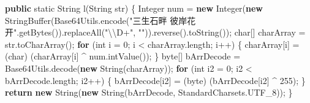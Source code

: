 \documentclass[
]{article}
\newenvironment{Shaded}{}{}
\newcommand{\BuiltInTok}[1]{\textcolor[rgb]{0.00,0.50,0.00}{#1}}
\newcommand{\ControlFlowTok}[1]{\textcolor[rgb]{0.00,0.44,0.13}{\textbf{#1}}}
\newcommand{\DataTypeTok}[1]{\textcolor[rgb]{0.56,0.13,0.00}{#1}}
\newcommand{\DecValTok}[1]{\textcolor[rgb]{0.25,0.63,0.44}{#1}}
\newcommand{\FunctionTok}[1]{\textcolor[rgb]{0.02,0.16,0.49}{#1}}
\newcommand{\KeywordTok}[1]{\textcolor[rgb]{0.00,0.44,0.13}{\textbf{#1}}}
\newcommand{\NormalTok}[1]{#1}
\newcommand{\OperatorTok}[1]{\textcolor[rgb]{0.40,0.40,0.40}{#1}}
\newcommand{\SpecialCharTok}[1]{\textcolor[rgb]{0.25,0.44,0.63}{#1}}
\newcommand{\StringTok}[1]{\textcolor[rgb]{0.25,0.44,0.63}{#1}}
\begin{document}
\begin{Shaded}
\begin{Highlighting}[]
    \KeywordTok{public} \DataTypeTok{static} \BuiltInTok{String} \FunctionTok{l}\OperatorTok{(}\BuiltInTok{String}\NormalTok{ str}\OperatorTok{)} \OperatorTok{\{}
        \BuiltInTok{Integer}\NormalTok{ num }\OperatorTok{=} \KeywordTok{new} \BuiltInTok{Integer}\OperatorTok{(}\KeywordTok{new} \BuiltInTok{StringBuffer}\OperatorTok{(}\NormalTok{Base64Utils}\OperatorTok{.}\FunctionTok{encode}\OperatorTok{(}\StringTok{"三生石畔 彼岸花开"}\OperatorTok{.}\FunctionTok{getBytes}\OperatorTok{()).}\FunctionTok{replaceAll}\OperatorTok{(}\StringTok{"}\SpecialCharTok{\textbackslash{}\textbackslash{}}\StringTok{D+"}\OperatorTok{,} \StringTok{""}\OperatorTok{)).}\FunctionTok{reverse}\OperatorTok{().}\FunctionTok{toString}\OperatorTok{());}
        \DataTypeTok{char}\OperatorTok{[]}\NormalTok{ charArray }\OperatorTok{=}\NormalTok{ str}\OperatorTok{.}\FunctionTok{toCharArray}\OperatorTok{();}
        \ControlFlowTok{for} \OperatorTok{(}\DataTypeTok{int}\NormalTok{ i }\OperatorTok{=} \DecValTok{0}\OperatorTok{;}\NormalTok{ i }\OperatorTok{\textless{}}\NormalTok{ charArray}\OperatorTok{.}\FunctionTok{length}\OperatorTok{;}\NormalTok{ i}\OperatorTok{++)} \OperatorTok{\{}
\NormalTok{            charArray}\OperatorTok{[}\NormalTok{i}\OperatorTok{]} \OperatorTok{=} \OperatorTok{(}\DataTypeTok{char}\OperatorTok{)} \OperatorTok{(}\NormalTok{charArray}\OperatorTok{[}\NormalTok{i}\OperatorTok{]} \OperatorTok{\^{}}\NormalTok{ num}\OperatorTok{.}\FunctionTok{intValue}\OperatorTok{());}
        \OperatorTok{\}}
        \DataTypeTok{byte}\OperatorTok{[]}\NormalTok{ bArrDecode }\OperatorTok{=}\NormalTok{ Base64Utils}\OperatorTok{.}\FunctionTok{decode}\OperatorTok{(}\KeywordTok{new} \BuiltInTok{String}\OperatorTok{(}\NormalTok{charArray}\OperatorTok{));}
        \ControlFlowTok{for} \OperatorTok{(}\DataTypeTok{int}\NormalTok{ i2 }\OperatorTok{=} \DecValTok{0}\OperatorTok{;}\NormalTok{ i2 }\OperatorTok{\textless{}}\NormalTok{ bArrDecode}\OperatorTok{.}\FunctionTok{length}\OperatorTok{;}\NormalTok{ i2}\OperatorTok{++)} \OperatorTok{\{}
\NormalTok{            bArrDecode}\OperatorTok{[}\NormalTok{i2}\OperatorTok{]} \OperatorTok{=} \OperatorTok{(}\DataTypeTok{byte}\OperatorTok{)} \OperatorTok{(}\NormalTok{bArrDecode}\OperatorTok{[}\NormalTok{i2}\OperatorTok{]} \OperatorTok{\^{}} \DecValTok{255}\OperatorTok{);}
        \OperatorTok{\}}
        \ControlFlowTok{return} \KeywordTok{new} \BuiltInTok{String}\OperatorTok{(}\KeywordTok{new} \BuiltInTok{String}\OperatorTok{(}\NormalTok{bArrDecode}\OperatorTok{,}\NormalTok{ StandardCharsets}\OperatorTok{.}\FunctionTok{UTF\_8}\OperatorTok{));}
    \OperatorTok{\}}


\end{Highlighting}
\end{Shaded}
\end{document}
